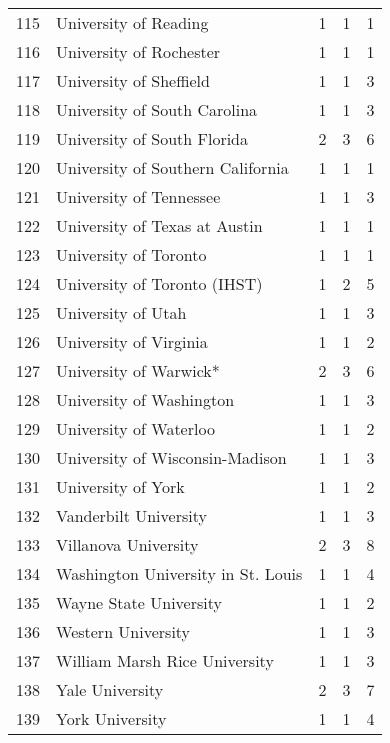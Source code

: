 \begin{table}[ht]
\begin{tabular}{rllll}
  115 & University of Reading & 1 & 1 & 1 \\ 
  116 & University of Rochester & 1 & 1 & 1 \\ 
  117 & University of Sheffield & 1 & 1 & 3 \\ 
  118 & University of South Carolina & 1 & 1 & 3 \\ 
  119 & University of South Florida & 2 & 3 & 6 \\ 
  120 & University of Southern California & 1 & 1 & 1 \\ 
  121 & University of Tennessee & 1 & 1 & 3 \\ 
  122 & University of Texas at Austin & 1 & 1 & 1 \\ 
  123 & University of Toronto & 1 & 1 & 1 \\ 
  124 & University of Toronto (IHST) & 1 & 2 & 5 \\ 
  125 & University of Utah & 1 & 1 & 3 \\ 
  126 & University of Virginia & 1 & 1 & 2 \\ 
  127 & University of Warwick* & 2 & 3 & 6 \\ 
  128 & University of Washington & 1 & 1 & 3 \\ 
  129 & University of Waterloo & 1 & 1 & 2 \\ 
  130 & University of Wisconsin-Madison & 1 & 1 & 3 \\ 
  131 & University of York & 1 & 1 & 2 \\ 
  132 & Vanderbilt University & 1 & 1 & 3 \\ 
  133 & Villanova University & 2 & 3 & 8 \\ 
  134 & Washington University in St. Louis & 1 & 1 & 4 \\ 
  135 & Wayne State University & 1 & 1 & 2 \\ 
  136 & Western University & 1 & 1 & 3 \\ 
  137 & William Marsh Rice University & 1 & 1 & 3 \\ 
  138 & Yale University & 2 & 3 & 7 \\ 
  139 & York University & 1 & 1 & 4 \\ 
   \hline
\end{tabular}
\end{table}

